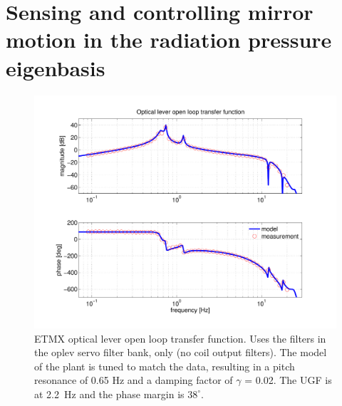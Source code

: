 \chapter{Sensing and controlling mirror motion in the radiation pressure eigenbasis} 



\begin{figure}
\begin{centering}
\includegraphics[width=1.0\textwidth]{figures/oplevOLG.pdf}
\caption{ETMX optical lever open loop transfer function. Uses the
  filters in the oplev servo filter bank, only (no coil output
  filters). The model of the plant is tuned to match the data,
  resulting in a pitch resonance of 0.65 Hz and a damping factor of
  $\gamma$ = 0.02. The UGF is at 2.2~Hz and the phase margin is
  $38^\circ$.}
\label{fig:}
\end{centering}
\end{figure}




